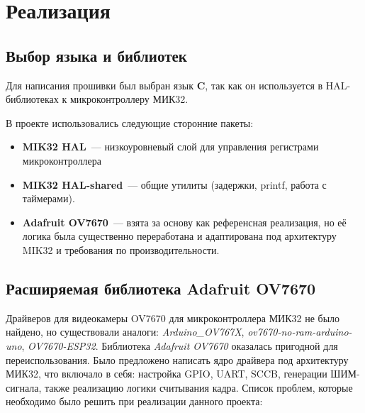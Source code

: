 \documentclass[a4paper]{article}
\begin{document}
\section{Реализация}
\subsection{Выбор языка и библиотек}
Для написания прошивки был выбран язык \textbf{C}, так как он используется в HAL-библиотеках к микроконтроллеру МИК32.

В проекте использовались следующие сторонние пакеты:
\begin{itemize}
    \item \textbf{MIK32 HAL}~--- низкоуровневый слой для управления регистрами микроконтроллера
    \item \textbf{MIK32 HAL-shared}~--- общие утилиты (задержки, printf, работа с таймерами).
    \item \textbf{Adafruit OV7670}~--- взята за основу как референсная реализация, но её логика была существенно переработана и адаптирована под архитектуру MIK32 и требования по производительности.
\end{itemize}

\subsection{Расширяемая библиотека Adafruit OV7670}
Драйверов для видеокамеры OV7670 для микроконтроллера МИК32 не было найдено, но существовали аналоги: \textit{Arduino\_OV767X}, \textit{ov7670-no-ram-arduino-uno}, \textit{OV7670-ESP32}.
Библиотека \textit{Adafruit OV7670} оказалась пригодной для переиспользования.
Было предложено написать ядро драйвера под архитектуру МИК32, что включало в себя: настройка GPIO, UART, SCCB, генерации ШИМ-сигнала, также реализацию логики считывания кадра.
Список проблем, которые необходимо было решить при реализации данного проекта:
    
\end{document}
